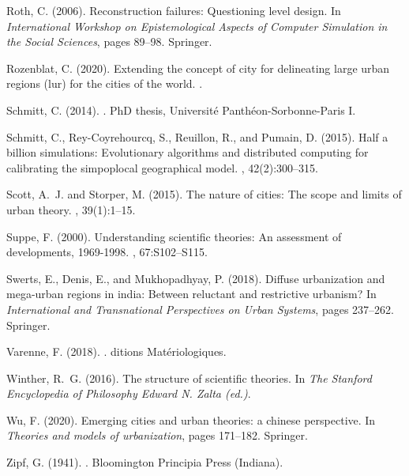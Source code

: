 \documentclass[10pt,letterpaper]{article}
\begin{document}
\begin{thebibliography}{}
Roth, C. (2006).
\newblock Reconstruction failures: Questioning level design.
\newblock In {\em International Workshop on Epistemological Aspects of Computer
  Simulation in the Social Sciences}, pages 89--98. Springer.

Rozenblat, C. (2020).
\newblock Extending the concept of city for delineating large urban regions
  (lur) for the cities of the world.
.

Schmitt, C. (2014).
.
\newblock PhD thesis, Universit{\'e} Panth{\'e}on-Sorbonne-Paris I.

Schmitt, C., Rey-Coyrehourcq, S., Reuillon, R., and Pumain, D. (2015).
\newblock Half a billion simulations: Evolutionary algorithms and distributed
  computing for calibrating the simpoplocal geographical model.
,
  42(2):300--315.

Scott, A.~J. and Storper, M. (2015).
\newblock The nature of cities: The scope and limits of urban theory.
,
  39(1):1--15.

Suppe, F. (2000).
\newblock Understanding scientific theories: An assessment of developments,
  1969-1998.
, 67:S102--S115.

Swerts, E., Denis, E., and Mukhopadhyay, P. (2018).
\newblock Diffuse urbanization and mega-urban regions in india: Between
  reluctant and restrictive urbanism?
\newblock In {\em International and Transnational Perspectives on Urban
  Systems}, pages 237--262. Springer.

Varenne, F. (2018).
.
ditions Mat{\'e}riologiques.

Winther, R.~G. (2016).
\newblock The structure of scientific theories.
\newblock In {\em The Stanford Encyclopedia of Philosophy Edward N. Zalta
  (ed.)}.

Wu, F. (2020).
\newblock Emerging cities and urban theories: a chinese perspective.
\newblock In {\em Theories and models of urbanization}, pages 171--182.
  Springer.

Zipf, G. (1941).
.
\newblock Bloomington Principia Press (Indiana).

\end{thebibliography}
\end{document}

